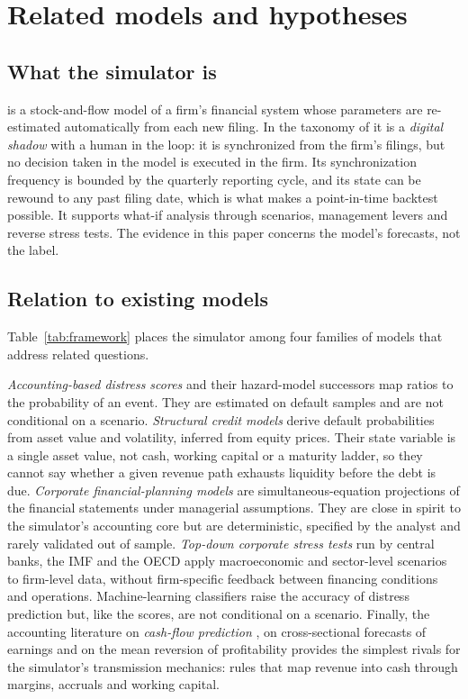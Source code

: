 \section{Related models and hypotheses}\label{sec:framework}

\subsection{What the simulator is}
\twin{} is a stock-and-flow model of a firm's financial system whose parameters are re-estimated automatically from each new filing. In the taxonomy of \citet{kritzinger2018} it is a \emph{digital shadow} with a human in the loop: it is synchronized from the firm's filings, but no decision taken in the model is executed in the firm. Its synchronization frequency is bounded by the quarterly reporting cycle, and its state can be rewound to any past filing date, which is what makes a point-in-time backtest possible. It supports what-if analysis through scenarios, management levers and reverse stress tests. The evidence in this paper concerns the model's forecasts, not the label.

\subsection{Relation to existing models}
Table~\ref{tab:framework} places the simulator among four families of models that address related questions.

\emph{Accounting-based distress scores} \citep{beaver1966,altman1968,ohlson1980,zmijewski1984} and their hazard-model successors \citep{shumway2001,chava2004,campbell2008} map ratios to the probability of an event. They are estimated on default samples and are not conditional on a scenario. \emph{Structural credit models} \citep{merton1974,leland1994} derive default probabilities from asset value and volatility, inferred from equity prices. Their state variable is a single asset value, not cash, working capital or a maturity ladder, so they cannot say whether a given revenue path exhausts liquidity before the debt is due. \emph{Corporate financial-planning models} \citep{carleton1970,warren1971} are simultaneous-equation projections of the financial statements under managerial assumptions. They are close in spirit to the simulator's accounting core but are deterministic, specified by the analyst and rarely validated out of sample. \emph{Top-down corporate stress tests} run by central banks, the IMF and the OECD \citep{imf2020,roulet2020} apply macroeconomic and sector-level scenarios to firm-level data, without firm-specific feedback between financing conditions and operations. Machine-learning classifiers \citep{barboza2017,mai2019,jones2017} raise the accuracy of distress prediction but, like the scores, are not conditional on a scenario. Finally, the accounting literature on \emph{cash-flow prediction} \citep{dechow1998,barth2001,kim2005,lev2010,nallareddy2020}, on cross-sectional forecasts of earnings \citep{hou2012,li2014} and on the mean reversion of profitability \citep{fama2000} provides the simplest rivals for the simulator's transmission mechanics: rules that map revenue into cash through margins, accruals and working capital.

